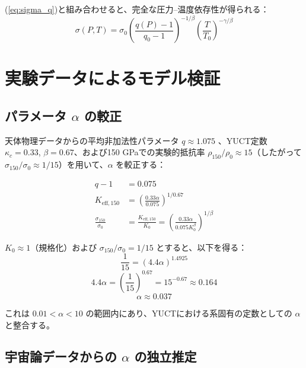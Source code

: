 \documentclass[11pt,a4paper]{article}
\newcommand{\kappac}{\kappa_c}
\newcommand{\alp}{\alpha}
\theoremstyle{remark}
\begin{document}
	(\ref{eq:sigma_q})と組み合わせると、完全な圧力–温度依存性が得られる：
	\begin{equation}
		\sigma(P,T) = \sigma_0 \left( \frac{q(P)-1}{q_0-1} \right)^{-1/\beta} \left( \frac{T}{T_0} \right)^{-\gamma/\beta}
		\label{eq:sigma_PT}
	\end{equation}
	
	\section{実験データによるモデル検証}
	
	\subsection{パラメータ \(\alp\) の較正}
	
	天体物理データからの平均非加法性パラメータ \(q \approx 1.075\) \cite{bertulani2015}、YUCT定数 \(\kappac = 0.33\), \(\beta = 0.67\)、および150 GPaでの実験的抵抗率 \(\rho_{150}/\rho_0 \approx 15\)（したがって \(\sigma_{150}/\sigma_0 \approx 1/15\)）を用いて、\(\alp\) を較正する：
	
	\begin{align}
		q - 1 &= 0.075 \nonumber \\
		K_{\mathrm{eff},150} &= \left( \frac{0.33 \alp}{0.075} \right)^{1/0.67} \nonumber \\
		\frac{\sigma_{150}}{\sigma_0} &= \frac{K_{\mathrm{eff},150}}{K_0} = \left( \frac{0.33 \alp}{0.075 K_0^{\beta}} \right)^{1/\beta} \label{eq:calibration}
	\end{align}
	
	\(K_0 \approx 1\)（規格化）および \(\sigma_{150}/\sigma_0 = 1/15\) とすると、以下を得る：
	\[
	\frac{1}{15} = \left( 4.4 \alp \right)^{1.4925}
	\]
	\[
	4.4 \alp = \left( \frac{1}{15} \right)^{0.67} = 15^{-0.67} \approx 0.164
	\]
	\[
	\alp \approx 0.037
	\]
	
	これは \(0.01 < \alp < 10\) の範囲内にあり、YUCTにおける系固有の定数としての \(\alp\) \cite{appendixC} と整合する。
	
	\subsection{宇宙論データからの \(\alp\) の独立推定}
	\label{subsec:alpha_cosmo}
	
\end{document}
